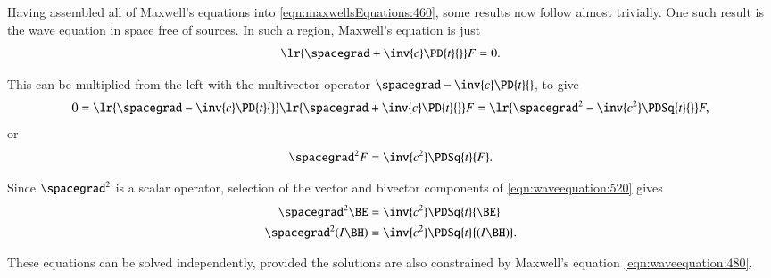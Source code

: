 %
%
Having assembled all of Maxwell's equations into \cref{eqn:maxwellsEquations:460}, some results now follow almost trivially.
One such result is the wave equation in space free of sources.
In such a region, Maxwell's equation is just
\begin{dmath}\label{eqn:waveequation:480}
\lr{ \spacegrad + \inv{c} \PD{t}{} } F = 0.
\end{dmath}

This can be multiplied from the left with the multivector operator \( \spacegrad - \inv{c} \PD{t}{} \), to give
\begin{dmath}\label{eqn:waveequation:500}
0 =
\lr{ \spacegrad - \inv{c} \PD{t}{} }
\lr{ \spacegrad + \inv{c} \PD{t}{} } F
=
\lr{ \spacegrad^2 - \inv{c^2} \PDSq{t}{} } F,
\end{dmath}
or
\begin{dmath}\label{eqn:waveequation:520}
\spacegrad^2 F = \inv{c^2} \PDSq{t}{F}.
\end{dmath}

Since \( \spacegrad^2 \) is a scalar operator, selection of the vector and bivector components of \cref{eqn:waveequation:520} gives
\begin{dmath}\label{eqn:waveequation:540}
\begin{aligned}
\spacegrad^2 \BE &= \inv{c^2} \PDSq{t}{\BE} \\
\spacegrad^2 (I \BH) &= \inv{c^2} \PDSq{t}{(I \BH)}.
\end{aligned}
\end{dmath}

These equations can be solved independently, provided the solutions are also constrained by Maxwell's equation \cref{eqn:waveequation:480}.
